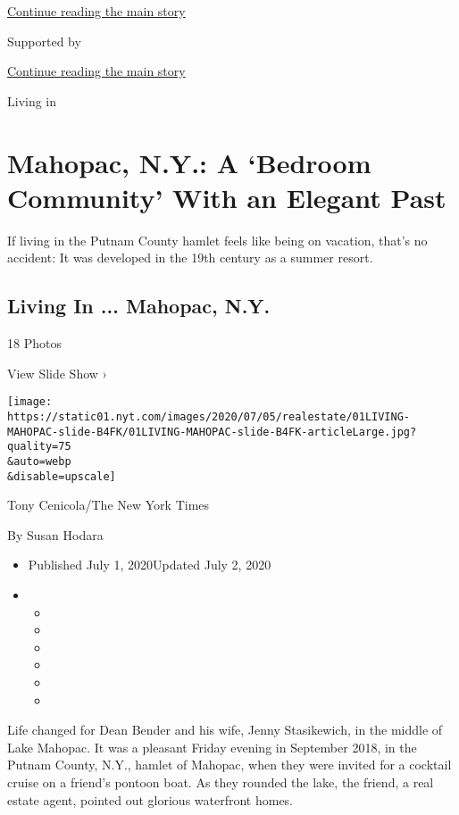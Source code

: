 \protect\hyperlink{after-top}{Continue reading the main story}

Supported by

\protect\hyperlink{after-sponsor}{Continue reading the main story}

Living in

\hypertarget{mahopac-ny-a-bedroom-community-with-an-elegant-past}{%
\section{Mahopac, N.Y.: A `Bedroom Community' With an Elegant
Past}\label{mahopac-ny-a-bedroom-community-with-an-elegant-past}}

If living in the Putnam County hamlet feels like being on vacation,
that's no accident: It was developed in the 19th century as a summer
resort.

\href{https://www.nytimes.com/slideshow/2020/07/01/realestate/living-in-mahopac-ny.html}{}

\hypertarget{living-in--mahopac-ny}{%
\subsection{Living In ... Mahopac, N.Y.}\label{living-in--mahopac-ny}}

18 Photos

View Slide Show ›

\texttt{[image: https://static01.nyt.com/images/2020/07/05/realestate/01LIVING-MAHOPAC-slide-B4FK/01LIVING-MAHOPAC-slide-B4FK-articleLarge.jpg?quality=75\\\&auto=webp\\\&disable=upscale]}

Tony Cenicola/The New York Times

By Susan Hodara

\begin{itemize}
\item
  Published July 1, 2020Updated July 2, 2020
\item
  \begin{itemize}
  \item
  \item
  \item
  \item
  \item
  \item
  \end{itemize}
\end{itemize}

Life changed for Dean Bender and his wife, Jenny Stasikewich, in the
middle of Lake Mahopac. It was a pleasant Friday evening in September
2018, in the Putnam County, N.Y., hamlet of Mahopac, when they were
invited for a cocktail cruise on a friend's pontoon boat. As they
rounded the lake, the friend, a real estate agent, pointed out glorious
waterfront homes.

